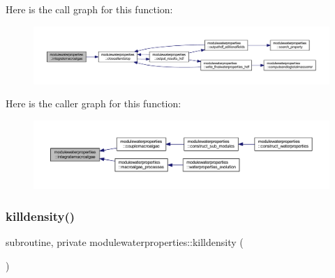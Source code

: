 Here is the call graph for this function\+:\nopagebreak
\begin{figure}[H]
\begin{center}
\leavevmode
\includegraphics[width=350pt]{namespacemodulewaterproperties_a27e3b4870b21a44136c19ab777be7e33_cgraph}
\end{center}
\end{figure}
Here is the caller graph for this function\+:\nopagebreak
\begin{figure}[H]
\begin{center}
\leavevmode
\includegraphics[width=350pt]{namespacemodulewaterproperties_a27e3b4870b21a44136c19ab777be7e33_icgraph}
\end{center}
\end{figure}
\mbox{\label{namespacemodulewaterproperties_aa8cc31da812d7fc89d0dcc1d1fafac2f}} 
\subsubsection{\texorpdfstring{killdensity()}{killdensity()}}
{\footnotesize\ttfamily subroutine, private modulewaterproperties\+::killdensity (\begin{DoxyParamCaption}{ }\end{DoxyParamCaption})\hspace{0.3cm}{\ttfamily [private]}}


